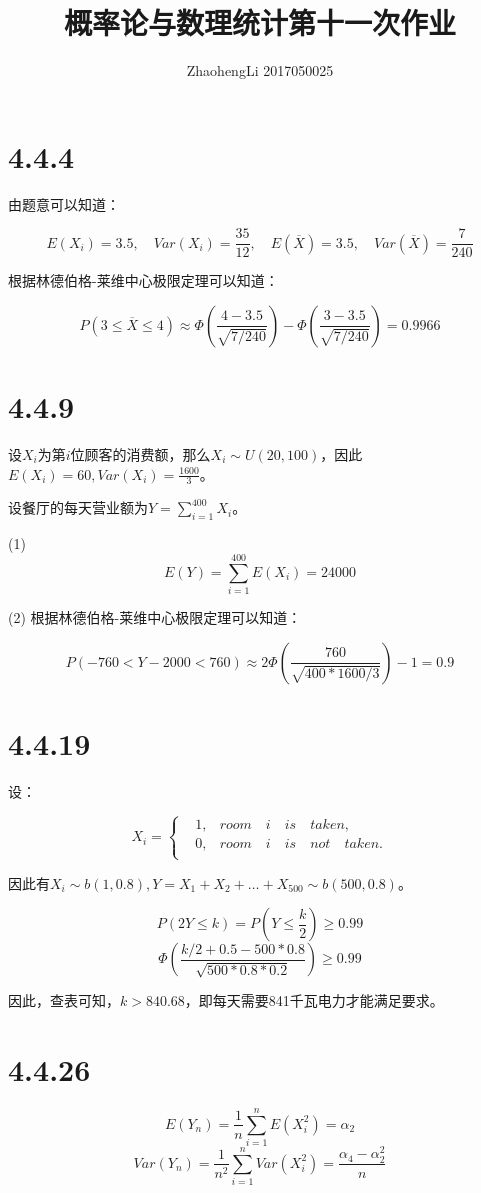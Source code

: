\documentclass{article}
\title{概率论与数理统计第十一次作业}
\author{ZhaohengLi 2017050025}
\begin{document}
\maketitle

\section{4.4.4}
由题意可以知道：

$$E(X_i)=3.5,\quad Var(X_i)=\frac{35}{12},\quad E(\overline X)=3.5,\quad Var(\overline X)=\frac7{240}$$

根据林德伯格-莱维中心极限定理可以知道：

$$P(3\leq \overline X \leq 4)\approx \Phi (\frac{4-3.5}{\sqrt{7/240}})-\Phi (\frac{3-3.5}{\sqrt{7/240}})=0.9966$$


\section{4.4.9}
设$X_i$为第$i$位顾客的消费额，那么$X_i\sim U(20,100)$，因此$E(X_i)=60,Var(X_i)=\frac{1600}{3}$。

设餐厅的每天营业额为$Y=\sum^{400}_{i=1}X_i$。

(1)
$$E(Y)=\sum^{400}_{i=1}E(X_i)=24000$$

(2)
根据林德伯格-莱维中心极限定理可以知道：

$$P(-760<Y-2000<760)\approx 2\Phi(\frac{760}{\sqrt{400*1600/3}})-1=0.9$$
\section{4.4.19}

设：

\begin{equation}
X_i = \left\{
\begin{aligned}
&1,& room\quad i\quad is\quad taken,\\
&0,& room\quad i\quad is\quad not\quad taken.\\
\end{aligned}
\right.
\end{equation}

因此有$X_i\sim b(1,0.8),Y=X_1+X_2+\dots+X_{500}\sim b(500,0.8)$。

$$P(2Y\leq k)=P(Y\leq \frac k2)\geq 0.99$$
$$\Phi(\frac{k/2+0.5-500*0.8}{\sqrt{500*0.8*0.2}})\geq 0.99$$

因此，查表可知，$k>840.68$，即每天需要841千瓦电力才能满足要求。


\section{4.4.26}
$$E(Y_n)=\frac 1n\sum^n_{i=1}E(X^2_i)=\alpha_2$$
$$Var(Y_n)=\frac1{n^2}\sum^n_{i=1}Var(X_i^2)=\frac{\alpha_4-\alpha^2_2}{n}$$
\end{document}
